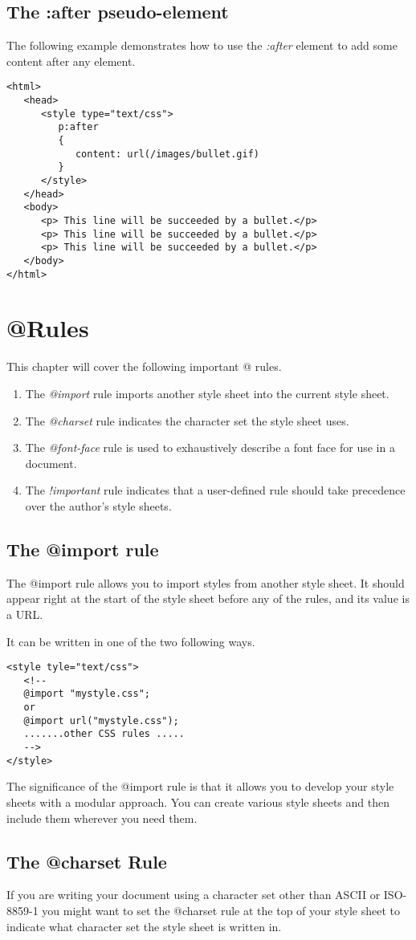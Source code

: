 \documentclass[a4paper,oneside]{book}
\numberwithin{equation}{chapter}
\begin{document}
\subsection{The :after pseudo-element}
The following example demonstrates how to use the \textit{:after} element to add some content after any element.
\begin{verbatim}
<html>
   <head>
      <style type="text/css">
         p:after
         {
            content: url(/images/bullet.gif)
         }
      </style>
   </head>
   <body>
      <p> This line will be succeeded by a bullet.</p>
      <p> This line will be succeeded by a bullet.</p>
      <p> This line will be succeeded by a bullet.</p>
   </body>
</html>
\end{verbatim}
\section{@Rules}
This chapter will cover the following important @ rules.
\begin{enumerate}
\item The \textit{@import} rule imports another style sheet into the current style sheet.
\item The \textit{@charset} rule indicates the character set the style sheet uses.
\item The \textit{@font-face} rule is used to exhaustively describe a font face for use in a document.
\item The \textit{!important} rule indicates that a user-defined rule should take precedence over the author's style sheets.
\end{enumerate}
\subsection{The @import rule}
The @import rule allows you to import styles from another style sheet. It should appear right at the start of the style sheet before any of the rules, and its value is a URL.

It can be written in one of the two following ways.
\begin{verbatim}
<style tyle="text/css">
   <!--
   @import "mystyle.css";
   or
   @import url("mystyle.css");
   .......other CSS rules .....
   -->
</style>
\end{verbatim}
The significance of the @import rule is that it allows you to develop your style sheets with a modular approach. You can create various style sheets and then include them wherever you need them.
\subsection{The @charset Rule}
If you are writing your document using a character set other than ASCII or ISO-8859-1 you might want to set the @charset rule at the top of your style sheet to indicate what character set the style sheet is written in.
\end{document}
